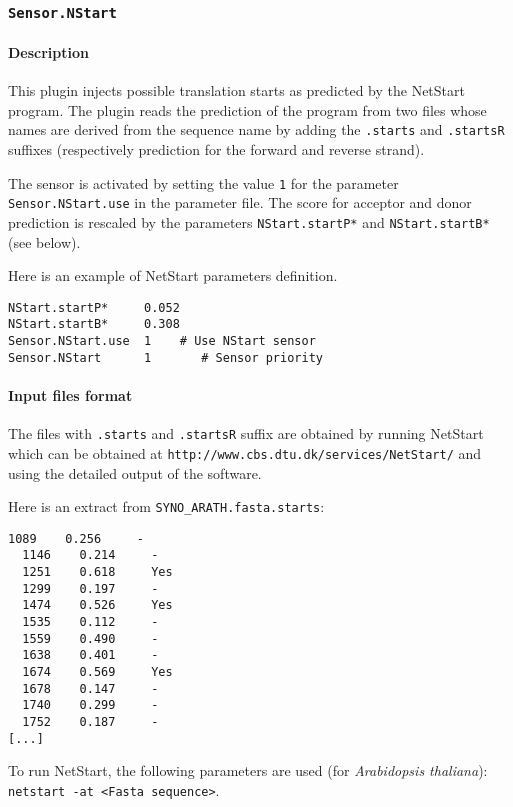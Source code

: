 
\subsubsection{\texttt{Sensor.NStart}}

\paragraph{Description}

This plugin injects possible translation starts as predicted by the
NetStart program. The plugin reads the prediction of the
program from two files whose names are derived from the sequence name
by adding the \texttt{.starts} and \texttt{.startsR} suffixes
(respectively prediction for the forward and reverse strand).

The sensor is activated by setting the value \texttt{1} for the parameter
\texttt{Sensor.NStart.use} in the parameter file. The score for acceptor
and donor prediction is rescaled by the parameters {\tt NStart.startP*} and
{\tt NStart.startB*} (see below).

Here is an example of NetStart parameters definition.
\begin{Verbatim}[fontsize=\small]
NStart.startP*     0.052
NStart.startB*     0.308
Sensor.NStart.use  1    # Use NStart sensor
Sensor.NStart      1       # Sensor priority
\end{Verbatim}

\paragraph{Input files format}

The files with \texttt{.starts} and \texttt{.startsR} suffix are
obtained by running NetStart which can be obtained at
\texttt{http://www.cbs.dtu.dk/services/NetStart/} and using the
detailed output of the software.

Here is an extract from \texttt{SYNO\_ARATH.fasta.starts}:
\begin{Verbatim}[fontsize=\small]
  1089    0.256     -
  1146    0.214     -
  1251    0.618     Yes
  1299    0.197     -
  1474    0.526     Yes
  1535    0.112     -
  1559    0.490     -
  1638    0.401     -
  1674    0.569     Yes
  1678    0.147     -
  1740    0.299     -
  1752    0.187     -
[...]
\end{Verbatim}

To run NetStart, the following parameters are used (for \emph{Arabidopsis
thaliana}): \texttt{netstart -at <Fasta sequence>}.

